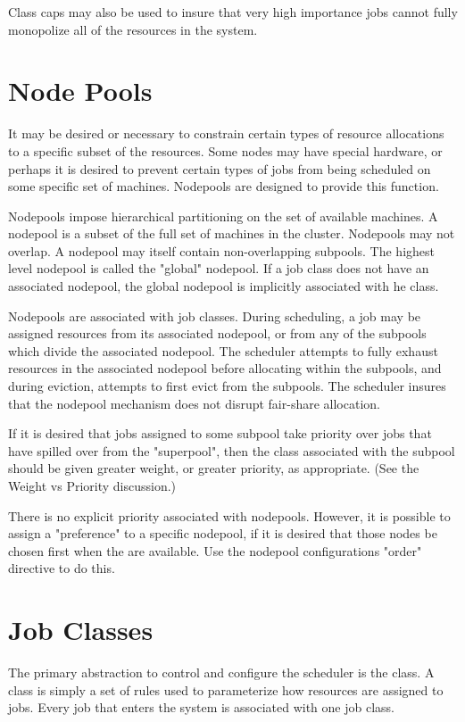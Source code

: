     Class caps may also be used to insure that very high importance jobs cannot fully monopolize all of 
    the resources in the system. 

    \section{Node Pools}
    It may be desired or necessary to constrain certain types of resource allocations to a specific
    subset of the resources. Some nodes may have special hardware, or perhaps it is desired to
    prevent certain types of jobs from being scheduled on some specific set of machines. Nodepools
    are designed to provide this function.

    Nodepools impose hierarchical partitioning on the set of available machines. A nodepool is a
    subset of the full set of machines in the cluster. Nodepools may not overlap. A nodepool may
    itself contain non-overlapping subpools. The highest level nodepool is called the "global"
    nodepool. If a job class does not have an associated nodepool, the global nodepool is implicitly
    associated with he class.

    Nodepools are associated with job classes. During scheduling, a job may be assigned resources
    from its associated nodepool, or from any of the subpools which divide the associated nodepool.
    The scheduler attempts to fully exhaust resources in the associated nodepool before allocating
    within the subpools, and during eviction, attempts to first evict from the subpools. The
    scheduler insures that the nodepool mechanism does not disrupt fair-share allocation.

    If it is desired that jobs assigned to some subpool take priority over jobs that have spilled
    over from the "superpool", then the class associated with the subpool should be given greater
    weight, or greater priority, as appropriate. (See the Weight vs Priority discussion.)

    There is no explicit priority associated with nodepools. However, it is possible to assign a
    "preference" to a specific nodepool, if it is desired that those nodes be chosen first when the
    are available. Use the nodepool configurations "order" directive to do this.

    \section{Job Classes}
    The primary abstraction to control and configure the scheduler is the class. A class is simply a set 
    of rules used to parameterize how resources are assigned to jobs. Every job that enters the system is 
    associated with one job class. 
    
